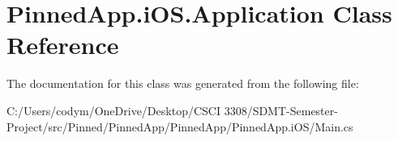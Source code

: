 \hypertarget{class_pinned_app_1_1i_o_s_1_1_application}{}\section{Pinned\+App.\+i\+O\+S.\+Application Class Reference}
\label{class_pinned_app_1_1i_o_s_1_1_application}


The documentation for this class was generated from the following file\+:\begin{DoxyCompactItemize}
\item 
C\+:/\+Users/codym/\+One\+Drive/\+Desktop/\+C\+S\+C\+I 3308/\+S\+D\+M\+T-\/\+Semester-\/\+Project/src/\+Pinned/\+Pinned\+App/\+Pinned\+App/\+Pinned\+App.\+i\+O\+S/Main.\+cs\end{DoxyCompactItemize}
